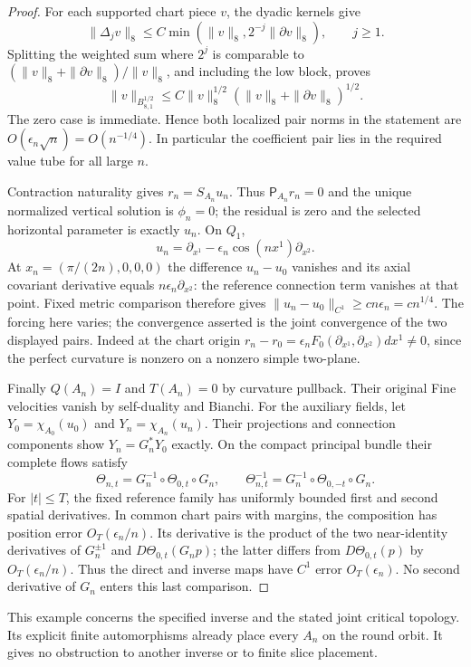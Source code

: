 \documentclass[11pt]{article}
\numberwithin{equation}{section}
\theoremstyle{definition}
\theoremstyle{remark}
\begin{document}
\begin{proof}
For each supported chart piece $v$, the dyadic kernels give
\[
 \|\Delta_jv\|_8\le C\min(\|v\|_8,2^{-j}\|\partial v\|_8),
 \qquad j\ge1.
\]
Splitting the weighted sum where
$2^j$ is comparable to
$(\|v\|_8+\|\partial v\|_8)/\|v\|_8$, and including
the low block, proves
\[
 \|v\|_{B^{1/2}_{8,1}}
 \le C\|v\|_8^{1/2}
             (\|v\|_8+\|\partial v\|_8)^{1/2}.
\]
The zero case is immediate. Hence both localized
pair norms in the statement are
$O(\epsilon_n\sqrt n)=O(n^{-1/4})$.
In particular the coefficient pair lies in the
required value tube for all large $n$.

Contraction naturality gives $r_n=S_{A_n}u_n$.
Thus $\mathsf P_{A_n}r_n=0$ and the unique normalized
vertical solution is $\phi_n=0$; the residual is zero
and the selected horizontal parameter is exactly $u_n$.
On $Q_1$,
\[
 u_n=\partial_{x^1}
        -\epsilon_n\cos(nx^1)\partial_{x^2}.
\]
At $x_n=(\pi/(2n),0,0,0)$ the difference $u_n-u_0$
vanishes and its axial covariant derivative equals
$n\epsilon_n\partial_{x^2}$: the reference connection
term vanishes at that point. Fixed metric comparison
therefore gives
$\|u_n-u_0\|_{C^1}\ge cn\epsilon_n=cn^{1/4}$.
The forcing here varies; the convergence asserted is
the joint convergence of the two displayed pairs.
Indeed at the chart origin
$r_n-r_0=\epsilon_nF_0(\partial_{x^1},\partial_{x^2})dx^1\ne0$,
since the perfect curvature is nonzero on a nonzero simple two-plane.

Finally $Q(A_n)=I$ and $T(A_n)=0$ by curvature
pullback. Their original Fine velocities vanish by
self-duality and Bianchi. For the auxiliary fields,
let $Y_0=\chi_{A_0}(u_0)$ and
$Y_n=\chi_{A_n}(u_n)$. Their projections and connection
components show $Y_n=G_n^*Y_0$ exactly. On the compact
principal bundle their complete flows satisfy
\[
 \Theta_{n,t}
   =G_n^{-1}\circ\Theta_{0,t}\circ G_n,\qquad
 \Theta_{n,t}^{-1}
   =G_n^{-1}\circ\Theta_{0,-t}\circ G_n .
\]
For $|t|\le T$, the fixed reference family has uniformly
bounded first and second spatial derivatives.
In common chart pairs with margins, the composition
has position error $O_T(\epsilon_n/n)$.
Its derivative is the product of the two near-identity
derivatives of $G_n^{\pm1}$ and
$D\Theta_{0,t}(G_np)$; the latter differs from
$D\Theta_{0,t}(p)$ by $O_T(\epsilon_n/n)$.
Thus the direct and inverse maps have $C^1$ error
$O_T(\epsilon_n)$. No second derivative of $G_n$
enters this last comparison.
\end{proof}

This example concerns the specified inverse and the
stated joint critical topology. Its explicit finite
automorphisms already place every $A_n$ on the round
orbit. It gives no obstruction to another inverse or
to finite slice placement.
\end{document}
